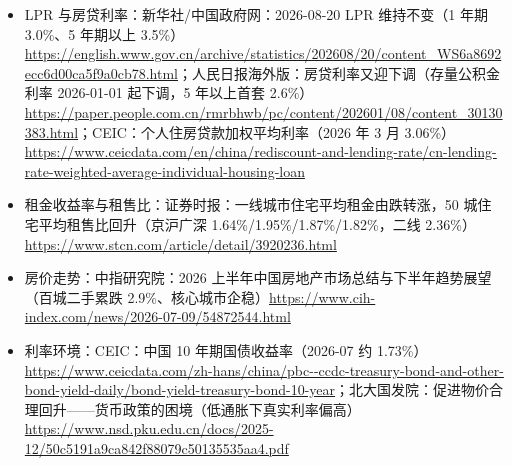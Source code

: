\documentclass[11pt,a4paper]{ctexart}
\begin{document}
\begin{itemize}\itemsep0.2em
\item LPR 与房贷利率：新华社/中国政府网：2026-08-20 LPR 维持不变（1 年期 3.0\%、5 年期以上 3.5\%）\url{https://english.www.gov.cn/archive/statistics/202608/20/content_WS6a8692ecc6d00ca5f9a0cb78.html}；人民日报海外版：房贷利率又迎下调（存量公积金利率 2026-01-01 起下调，5 年以上首套 2.6\%）\url{https://paper.people.com.cn/rmrbhwb/pc/content/202601/08/content_30130383.html}；CEIC：个人住房贷款加权平均利率（2026 年 3 月 3.06\%）\url{https://www.ceicdata.com/en/china/rediscount-and-lending-rate/cn-lending-rate-weighted-average-individual-housing-loan}
\item 租金收益率与租售比：证券时报：一线城市住宅平均租金由跌转涨，50 城住宅平均租售比回升（京沪广深 1.64\%/1.95\%/1.87\%/1.82\%，二线 2.36\%）\url{https://www.stcn.com/article/detail/3920236.html}
\item 房价走势：中指研究院：2026 上半年中国房地产市场总结与下半年趋势展望（百城二手累跌 2.9\%、核心城市企稳）\url{https://www.cih-index.com/news/2026-07-09/54872544.html}
\item 利率环境：CEIC：中国 10 年期国债收益率（2026-07 约 1.73\%）\url{https://www.ceicdata.com/zh-hans/china/pbc--ccdc-treasury-bond-and-other-bond-yield-daily/bond-yield-treasury-bond-10-year}；北大国发院：促进物价合理回升——货币政策的困境（低通胀下真实利率偏高）\url{https://www.nsd.pku.edu.cn/docs/2025-12/50c5191a9ca842f88079c50135535aa4.pdf}
\end{itemize}
\end{document}
